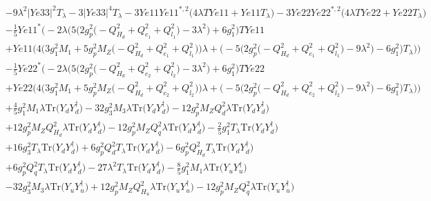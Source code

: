 \begin{align}
 &-9 \lambda^{2} |Ye33|^2 T_{\lambda} -3 |Ye33|^4 T_{\lambda} -3 Ye11 Ye11^{*,2} \Big(4 \lambda TYe11  + Ye11 T_{\lambda} \Big)-3 Ye22 Ye22^{*,2} \Big(4 \lambda TYe22  + Ye22 T_{\lambda} \Big)\nonumber \\ 
 &-\frac{1}{5} Ye11^* \Big(-2 \lambda \Big(5 \Big(2 g_{p}^{2} \Big(- Q_{H_d}^{2}  + Q_{e_{1}}^{2} + Q_{l_1}^{2}\Big) -3 \lambda^{2} \Big) + 6 g_{1}^{2} \Big)TYe11 \nonumber \\ 
 &+Ye11 \Big(4 \Big(3 g_{1}^{2} M_1  + 5 g_{p}^{2} M_Z \Big(- Q_{H_d}^{2}  + Q_{e_{1}}^{2} + Q_{l_1}^{2}\Big)\Big)\lambda  + \Big(-5 \Big(2 g_{p}^{2} \Big(- Q_{H_d}^{2}  + Q_{e_{1}}^{2} + Q_{l_1}^{2}\Big) -9 \lambda^{2} \Big) -6 g_{1}^{2} \Big)T_{\lambda} \Big)\Big)\nonumber \\ 
 &-\frac{1}{5} Ye22^* \Big(-2 \lambda \Big(5 \Big(2 g_{p}^{2} \Big(- Q_{H_d}^{2}  + Q_{e_{2}}^{2} + Q_{l_2}^{2}\Big) -3 \lambda^{2} \Big) + 6 g_{1}^{2} \Big)TYe22 \nonumber \\ 
 &+Ye22 \Big(4 \Big(3 g_{1}^{2} M_1  + 5 g_{p}^{2} M_Z \Big(- Q_{H_d}^{2}  + Q_{e_{2}}^{2} + Q_{l_2}^{2}\Big)\Big)\lambda  + \Big(-5 \Big(2 g_{p}^{2} \Big(- Q_{H_d}^{2}  + Q_{e_{2}}^{2} + Q_{l_2}^{2}\Big) -9 \lambda^{2} \Big) -6 g_{1}^{2} \Big)T_{\lambda} \Big)\Big)\nonumber \\ 
 &+\frac{4}{5} g_{1}^{2} M_1 \lambda \mbox{Tr}\Big({Y_d  Y_{d}^{\dagger}}\Big) -32 g_{3}^{2} M_3 \lambda \mbox{Tr}\Big({Y_d  Y_{d}^{\dagger}}\Big) -12 g_{p}^{2} M_Z Q_{d}^{2} \lambda \mbox{Tr}\Big({Y_d  Y_{d}^{\dagger}}\Big) \nonumber \\ 
 &+12 g_{p}^{2} M_Z Q_{H_d}^{2} \lambda \mbox{Tr}\Big({Y_d  Y_{d}^{\dagger}}\Big) -12 g_{p}^{2} M_Z Q_{q}^{2} \lambda \mbox{Tr}\Big({Y_d  Y_{d}^{\dagger}}\Big) -\frac{2}{5} g_{1}^{2} T_{\lambda} \mbox{Tr}\Big({Y_d  Y_{d}^{\dagger}}\Big) \nonumber \\ 
 &+16 g_{3}^{2} T_{\lambda} \mbox{Tr}\Big({Y_d  Y_{d}^{\dagger}}\Big) +6 g_{p}^{2} Q_{d}^{2} T_{\lambda} \mbox{Tr}\Big({Y_d  Y_{d}^{\dagger}}\Big) -6 g_{p}^{2} Q_{H_d}^{2} T_{\lambda} \mbox{Tr}\Big({Y_d  Y_{d}^{\dagger}}\Big) \nonumber \\ 
 &+6 g_{p}^{2} Q_{q}^{2} T_{\lambda} \mbox{Tr}\Big({Y_d  Y_{d}^{\dagger}}\Big) -27 \lambda^{2} T_{\lambda} \mbox{Tr}\Big({Y_d  Y_{d}^{\dagger}}\Big) -\frac{8}{5} g_{1}^{2} M_1 \lambda \mbox{Tr}\Big({Y_u  Y_{u}^{\dagger}}\Big) \nonumber \\ 
 &-32 g_{3}^{2} M_3 \lambda \mbox{Tr}\Big({Y_u  Y_{u}^{\dagger}}\Big) +12 g_{p}^{2} M_Z Q_{H_u}^{2} \lambda \mbox{Tr}\Big({Y_u  Y_{u}^{\dagger}}\Big) -12 g_{p}^{2} M_Z Q_{q}^{2} \lambda \mbox{Tr}\Big({Y_u  Y_{u}^{\dagger}}\Big) \nonumber \\ 

\end{align}
